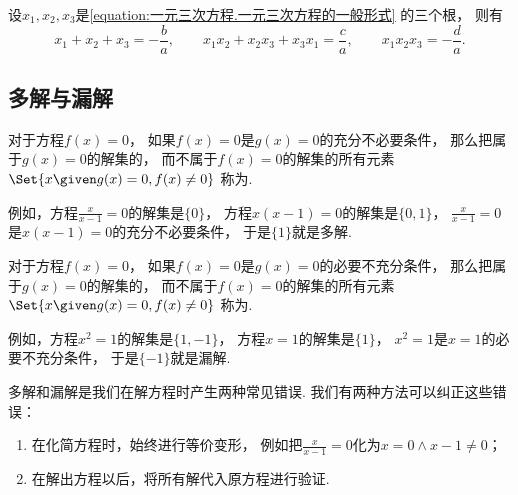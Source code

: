 \begin{theorem}[韦达定理]\label{theorem:一元三次方程.韦达定理}
设\(x_1,x_2,x_3\)是\cref{equation:一元三次方程.一元三次方程的一般形式} 的三个根，
则有\begin{equation*}
	x_1 + x_2 + x_3 = -\frac{b}{a},
	\qquad
	x_1 x_2 + x_2 x_3 + x_3 x_1 = \frac{c}{a},
	\qquad
	x_1 x_2 x_3 = -\frac{d}{a}.
\end{equation*}
\end{theorem}

\subsection{多解与漏解}
对于方程\(f(x) = 0\)，
如果\(f(x) = 0\)是\(g(x) = 0\)的充分不必要条件，
那么把属于\(g(x) = 0\)的解集的，
而不属于\(f(x) = 0\)的解集的所有元素
\(\Set{ x \given g(x) = 0, f(x) \neq 0 }\)
称为.

例如，方程\(\frac{x}{x-1} = 0\)的解集是\(\{0\}\)，
方程\(x(x-1) = 0\)的解集是\(\{0,1\}\)，
\(\frac{x}{x-1} = 0\)是\(x(x-1) = 0\)的充分不必要条件，
于是\(\{1\}\)就是多解.

对于方程\(f(x) = 0\)，
如果\(f(x) = 0\)是\(g(x) = 0\)的必要不充分条件，
那么把属于\(g(x) = 0\)的解集的，
而不属于\(f(x) = 0\)的解集的所有元素
\(\Set{ x \given g(x) = 0, f(x) \neq 0 }\)
称为.

例如，方程\(x^2 = 1\)的解集是\(\{1,-1\}\)，
方程\(x = 1\)的解集是\(\{1\}\)，
\(x^2 = 1\)是\(x = 1\)的必要不充分条件，
于是\(\{-1\}\)就是漏解.

多解和漏解是我们在解方程时产生两种常见错误.
我们有两种方法可以纠正这些错误：\begin{enumerate}
	\item 在化简方程时，始终进行等价变形，
	例如把\(\frac{x}{x-1} = 0\)化为\(x = 0 \land x-1 \neq 0\)；

	\item 在解出方程以后，将所有解代入原方程进行验证.
\end{enumerate}
